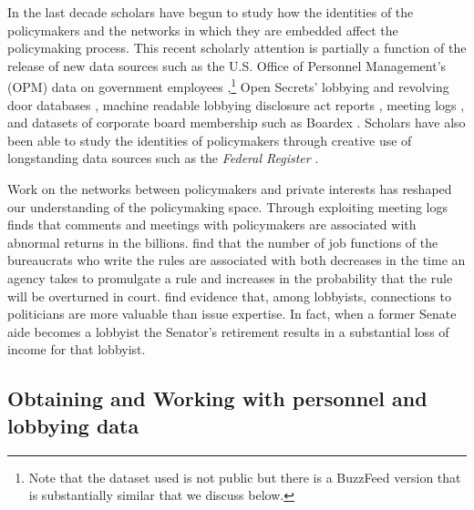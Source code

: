 \documentclass[12pt,notitlepage]{article}
\newcounter{cor}
\begin{document}
In the last decade scholars have begun to study how the identities of
the policymakers and the networks in which they are embedded affect the
policymaking process. This recent scholarly attention is partially a
function of the release of new data sources such as the U.S. Office of
Personnel Management's (OPM) data on government employees
\citep[e.g.,][]{Bolton_AMP_2018},\footnote{Note that the dataset
  \citet{Bolton_AMP_2018} used is not public but there is a BuzzFeed
  version that is substantially similar that we discuss below.} Open
Secrets' lobbying \citep[e.g.,][]{Baumgartner_2009} and revolving door
databases \citep[e.g.,][]{Vidal_AER_2012, Bertrand_AER_2014}, machine
readable lobbying disclosure act reports
\citep[e.g.,][]{Boehmke_JPP_2013, You_JOP_2017}, meeting logs
\citep{Libgober_QJPS}, and datasets of corporate board membership such
as Boardex \citep[e.g.,][]{Shive_ROF_2016}. Scholars have also been able
to study the identities of policymakers through creative use of
longstanding data sources such as the \emph{Federal Register}
\citep[e.g.~][]{Carrigan_PAR_2019}.

Work on the networks between policymakers and private interests has
reshaped our understanding of the policymaking space. Through exploiting
meeting logs \citet{Libgober_QJPS} finds that comments and meetings with
policymakers are associated with abnormal returns in the billions.
\citet{Carrigan_PAR_2019} find that the number of job functions of the
bureaucrats who write the rules are associated with both decreases in
the time an agency takes to promulgate a rule and increases in the
probability that the rule will be overturned in court.
\citet{Vidal_AER_2012} find evidence that, among lobbyists, connections
to politicians are more valuable than issue expertise. In fact, when a
former Senate aide becomes a lobbyist the Senator's retirement results
in a substantial loss of income for that lobbyist.

\hypertarget{obtaining-and-working-with-personnel-and-lobbying-data}{%
\subsection*{Obtaining and Working with personnel and lobbying
data}\label{obtaining-and-working-with-personnel-and-lobbying-data}}
\end{document}
